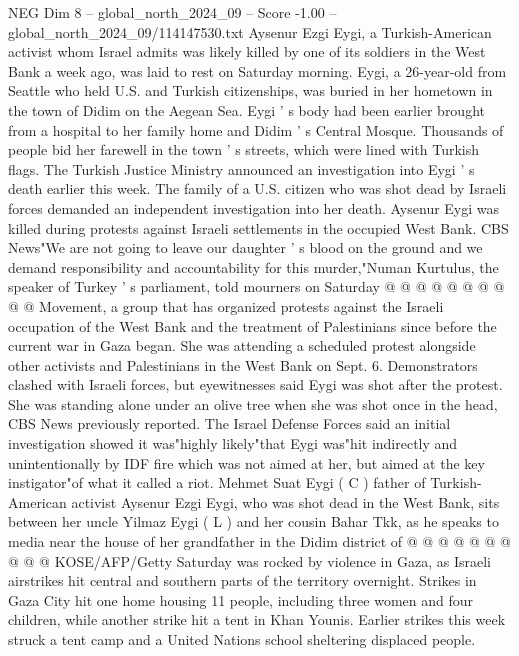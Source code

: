 \begin{textsample}{NEG Dim 8 – global\_north\_2024\_09 – Score -1.00 – global\_north\_2024\_09/114147530.txt}  \label{ex:f8_neg_152}
Aysenur Ezgi Eygi, a Turkish-American activist whom Israel admits was likely killed by one of its soldiers in the West Bank a week ago, was laid to rest on Saturday morning.
Eygi, a 26-year-old from Seattle who held U.S. and Turkish citizenships, was buried in her hometown in the town of Didim on the Aegean Sea.
Eygi ' s body had been earlier brought from a hospital to her family home and Didim ' s Central Mosque.
Thousands of people bid her farewell in the town ' s streets, which were lined with Turkish flags.
The Turkish Justice Ministry announced an investigation into Eygi ' s death earlier this week.
The family of a U.S. citizen who was shot dead by Israeli forces demanded an independent investigation into her death.
Aysenur Eygi was killed during protests against Israeli settlements in the occupied West Bank.
CBS News"We are not going to leave our daughter ' s blood on the ground and we demand responsibility and accountability for this murder,"Numan Kurtulus, the speaker of Turkey ' s parliament, told mourners on Saturday @ @ @ @ @ @ @ @ @ @ Movement, a group that has organized protests against the Israeli occupation of the West Bank and the treatment of Palestinians since before the current war in Gaza began.
She was attending a scheduled protest alongside other activists and Palestinians in the West Bank on Sept. 6.
Demonstrators clashed with Israeli forces, but eyewitnesses said Eygi was shot after the protest.
She was standing alone under an olive tree when she was shot once in the head, CBS News previously reported.
The Israel Defense Forces said an initial investigation showed it was"highly likely"that Eygi was"hit indirectly and unintentionally by IDF fire which was not aimed at her, but aimed at the key instigator"of what it called a riot.
Mehmet Suat Eygi ( C ) father of Turkish-American activist Aysenur Ezgi Eygi, who was shot dead in the West Bank, sits between her uncle Yilmaz Eygi ( L ) and her cousin Bahar Tkk, as he speaks to media near the house of her grandfather in the Didim district of @ @ @ @ @ @ @ @ @ @ KOSE/AFP/Getty Saturday was rocked by violence in Gaza, as Israeli airstrikes hit central and southern parts of the territory overnight.
Strikes in Gaza City hit one home housing 11 people, including three women and four children, while another strike hit a tent in Khan Younis.
Earlier strikes this week struck a tent camp and a United Nations school sheltering displaced people.

\end{textsample}
